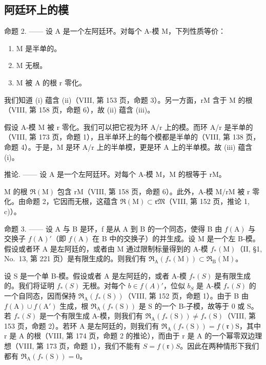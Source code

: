 \subsection{阿廷环上的模}

命题 2. —— 设 A 是一个左阿廷环。对每个 A-模 M，下列性质等价：

\begin{enumerate}
\def\labelenumi{(\roman{enumi})}
\item
  M 是半单的。
\item
  M 无根。
\item
  M 被 A 的根 r 零化。
\end{enumerate}

我们知道 (i) 蕴含 (ii)（VIII, 第 153 页，命题 3）。另一方面，rM 含于 M 的根（VIII, 第 158 页，命题 6），故 (ii) 蕴含 (iii)。

假设 A-模 M 被 r 零化。我们可以把它视为环 A/r 上的模。而环 A/r 是半单的（VIII, 第 173 页，命题 1），且半单环上的每个模都是半单的（VIII, 第 138 页，命题 4）。于是，M 是环 A/r 上的半单模，更是环 A 上的半单模。故 (iii) 蕴含 (i)。

推论. —— 设 A 是一个左阿廷环。对每个 A-模 M，M 的根等于 rM。

M 的根 \(\Re(\mathrm{M})\) 包含 rM（VIII, 第 158 页，命题 6）。此外，A-模 M/rM 被 r 零化。由命题 2，它因而无根，这蕴含 \(\Re(\mathrm{M}) \subset \mathfrak{rM}\)（VIII, 第 152 页，推论 1, c)）。

命题 3. —— 设 A 与 B 是环，f 是从 A 到 B 的一个同态，使得 B 由 \(f(\mathrm{A})\) 与交换子 \(f(\mathrm{A})'\)（即 \(f(\mathrm{A})\) 在 B 中的交换子）的并生成。设 M 是一个左 B-模。假设或者环 A 是左阿廷的，或者由 M 通过限制标量得到的 A-模 \(f_{*}(\mathrm{M})\)（II, §1, No.~13, 第 221 页）是有限生成的。则我们有 \(\mathfrak{R}_{\mathrm{A}}(f_{*}(\mathrm{M})) \subset \mathfrak{R}_{\mathrm{B}}(\mathrm{M})\)。

设 S 是一个单 B-模。假设或者 A 是左阿廷的，或者 A-模 \(f_{*}(S)\) 是有限生成的。我们将证明 \(f_{*}(S)\) 无根。对每个 \(b \in f(A)'\)，位似 \(b_{S}\) 是 A-模 \(f_{*}(S)\) 的一个自同态，因而保持 \(\mathfrak{R}_{\mathrm{A}}(f_{*}(\mathrm{S}))\)（VIII, 第 152 页，命题 1）。由于 B 由 \(f(\mathrm{A}) \cup f(\mathrm{A}')\) 生成，根 \(\mathfrak{R}_{\mathrm{A}}(f_{*}(\mathrm{S}))\) 是 S 的一个 B-子模，故等于 0 或 S。若 \(f_{*}(S)\) 是一个有限生成 A-模，则我们有 \(\mathfrak{R}_{\mathrm{A}}(f_{*}(\mathrm{S})) \neq f_{*}(\mathrm{S})\)（VIII, 第 153 页，命题 2）。若环 A 是左阿廷的，则我们有 \(\mathfrak{R}_{\mathrm{A}}(f_{*}(\mathrm{S})) = f(\mathfrak{r})\mathrm{S}\)，其中 r 是 A 的根（VIII, 第 174 页，命题 2 的推论），而由于 r 是 A 的一个幂零双边理想（VIII, 第 173 页，命题 1），我们不能有 \(S = f(\mathfrak{r})S\)。因此在两种情形下我们都有 \(\mathfrak{R}_{\mathrm{A}}(f_{*}(\mathrm{S})) = 0\)。

